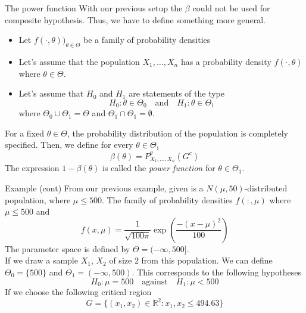 \documentclass{beamer}
\begin{document}
\begin{frame}{The power function}
	With our previous setup the $\beta$ could not be used for composite hypothesis. Thus, we have to define something more general. 
	\begin{itemize}
		\item Let $f(\cdot, \theta))_{\theta \in \Theta}$ be a family of probability densities 
		\item Let's assume that the population $X_1,\ldots, X_n$  has a probability density $f(\cdot,\theta)$ where $\theta \in \Theta$.  
		\item Let's assume that $H_0$ and $H_1$ are statements of the type
		\begin{equation*}
			H_0 \colon \theta \in \Theta_0 \quad \text{and} \quad H_1\colon \theta \in \Theta_1
		\end{equation*}
	where $\Theta_0 \cup \Theta_1= \Theta$ and $\Theta_1 \cap \Theta_1= \emptyset$.
	
	\end{itemize}
	For a fixed $\theta \in \Theta$, the probability distribution of the population is completely specified. Then, we define for every $\theta \in \Theta_1$
	\begin{equation*}
		\beta(\theta)= P_{X_1,\ldots, X_n}^\theta (G^c)
	\end{equation*}
	The expression $1-\beta(\theta)$ is called the \textit{power function} for $\theta \in \Theta_1$.
\end{frame}

\begin{frame}{Example (cont)}
	From our previous example, given is a $N(\mu, 50)$-distributed population, where $\mu \le 500$. 
	The family of probability densities $f(\colon, \mu)$ where $\mu\le 500$ and 
	\begin{equation*}
		f(x,\mu)= \frac{1}{\sqrt{100 \pi}} \exp(\frac{-(x-\mu)^2}{100})
	\end{equation*}
	The parameter space is defined by $\Theta=(-\infty, 500]$. \\
	If we draw a sample $X_1$, $X_2$ of size 2 from this population. We can define $\Theta_0=\{500\}$ and $\Theta_1= (-\infty, 500)$. This corresponds to the following hypotheses
	\begin{equation*}
		H_0 \colon \mu = 500 \quad \text{against} \quad H_1 \colon \mu< 500
	\end{equation*}
If we choose the following critical region 
\begin{equation*}
	G= \{ (x_1,x_2)\in \mathbb{R}^2: x_1, x_2 \le 494.63 \}
\end{equation*}

	
\end{frame}
\end{document}
